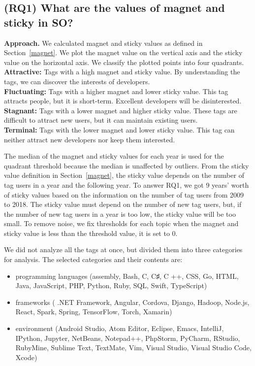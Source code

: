\documentclass[english,preprint,JIP,technote]{ipsj}
\begin{document}
\subsection{(RQ1) What are the values of magnet and sticky in SO?}

\noindent
\textbf{Approach.}
We calculated magnet and sticky values as defined in Section~\ref{magnet}. We plot the magnet value on the vertical axis and the sticky value on the horizontal axis. We classify the plotted points into four quadrants.\\
\textbf
{Attractive:} Tags with a high magnet and sticky value. By understanding the tags, we can discover the interests of developers.\\
\textbf{Fluctuating:} Tags with a higher magnet and lower sticky value. This tag attracts people, but it is short-term. Excellent developers will be disinterested.\\
\textbf{Stagnant:} Tags with a lower magnet and higher sticky value. These tags are difficult to attract new users, but it can maintain existing users.\\
\textbf{Terminal:} Tags with the lower magnet and lower sticky value. This tag can neither attract new developers nor keep them interested.

The median of the magnet and sticky values for each year is used for the quadrant threshold because the median is unaffected by outliers. From the sticky value definition in Section~\ref{magnet}, the sticky value depends on the number of tag users in a year and the following year. To answer RQ1, we got 9 years’ worth of sticky values based on the information on the number of tag users from 2009 to 2018. The sticky value must depend on the number of new tag users, but, if the number of new tag users in a year is too low, the sticky value will be too small. To remove noise, we fix thresholds for each topic when the magnet and sticky value is less than the threshold value, it is set to 0.


We did not analyze all the tags at once, but divided them into three categories for analysis. The selected categories and their contents are:
\begin{itemize}
\item programming languages ​​(assembly, Bash, C, C♯, C ++, CSS, Go, HTML, Java, JavaScript, PHP, Python, Ruby, SQL, Swift, TypeScript)
\item frameworks ( .NET Framework, Angular, Cordova, Django, Hadoop, Node.js, React, Spark, Spring, TensorFlow, Torch, Xamarin)
\item environment (Android Studio, Atom Editor, Eclipse, Emacs, IntelliJ, IPython, Jupyter, NetBeans, Notepad++, PhpStorm, PyCharm, RStudio, RubyMine, Sublime Text, TextMate, Vim, Visual Studio, Visual Studio Code, Xcode)
\end{itemize}
\end{document}
